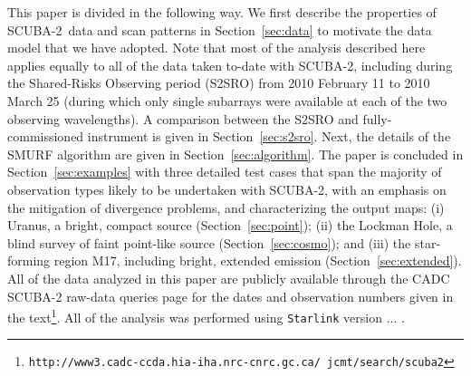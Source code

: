 \documentclass[useAMS,usenatbib,nofootinbib]{mn2e}
\newcommand{\scuba}{SCUBA-2}
\begin{document}
This paper is divided in the following way. We first describe the
properties of \scuba\ data and scan patterns in Section~\ref{sec:data}
to motivate the data model that we have adopted. Note that most of the
analysis described here applies equally to all of the data taken
to-date with \scuba, including during the Shared-Risks Observing
period (S2SRO) from 2010 February 11 to 2010 March 25 (during which
only single subarrays were available at each of the two observing
wavelengths). A comparison between the S2SRO and fully-commissioned
instrument is given in Section~\ref{sec:s2sro}. Next, the details of
the SMURF algorithm are given in Section~\ref{sec:algorithm}. The
paper is concluded in Section~\ref{sec:examples} with three detailed
test cases that span the majority of observation types likely to be
undertaken with \scuba, with an emphasis on the mitigation of
divergence problems, and characterizing the output maps: (i) Uranus, a
bright, compact source (Section~\ref{sec:point}); (ii) the Lockman
Hole, a blind survey of faint point-like source
(Section~\ref{sec:cosmo}); and (iii) the star-forming region M17,
including bright, extended emission (Section~\ref{sec:extended}). All
of the data analyzed in this paper are publicly available through the
CADC SCUBA-2 raw-data queries page for the dates and observation
numbers given in the
text\footnote{\texttt{http://www3.cadc-ccda.hia-iha.nrc-cnrc.gc.ca/
jcmt/search/scuba2}}. All of the analysis was performed using
\texttt{Starlink} version ... .






\end{document}
